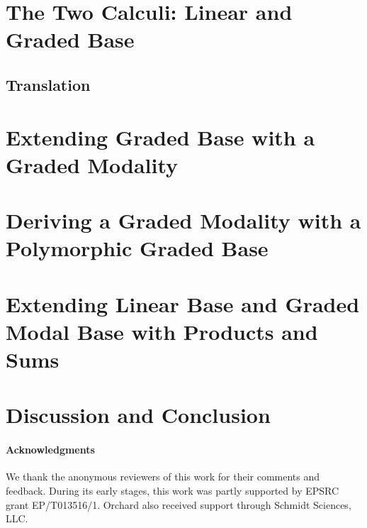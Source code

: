\documentclass[acmsmall, screen, nonacm]{acmart}
\theoremstyle{acmdefinition}%
\begin{document}
\section{The Two Calculi: Linear and Graded Base}
\label{sec:calculi}


\subsection{Translation}
\label{sec:transl}


\section{Extending Graded Base with a Graded Modality}
\label{sec:calculi-with-modality}


\section{Deriving a Graded Modality with a Polymorphic Graded Base}
\label{sec:poly}


\section{Extending Linear Base and Graded Modal Base with Products and Sums}
\label{sec:prods-sums}


\section{Discussion and Conclusion}
\label{sec:discussion}


\paragraph{Acknowledgments}

We thank the anonymous reviewers of this work for their comments and feedback.
During its early stages, this work was partly supported by EPSRC grant EP/T013516/1.
Orchard also received support through Schmidt Sciences, LLC.



\ifextended
\newpage
\appendix

\fi
\end{document}
